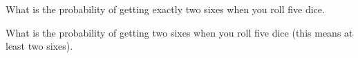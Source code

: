 \begin{myenum}
\item What is the probability of getting exactly two sixes when you roll five
dice.
\item  What is the probability of getting two sixes when you roll five dice
  (this means at least two sixes).
  \end{myenum}
